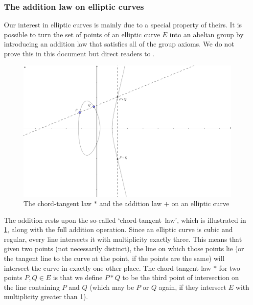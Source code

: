 \subsubsection{The addition law on elliptic curves}
Our interest in elliptic curves is mainly due to a special property of theirs.
It is possible to turn the set of points of an elliptic curve $E$ into an abelian group by introducing an addition law that satisfies all of the group axioms.
We do not prove this in this document but direct readers to \cite{silverman2009}.
\begin{figure}[htbp]
	\centering
	\includegraphics[scale=0.3]{../Figures/ellipticaddition.png}
	\caption{The chord-tangent law $*$ and the addition law $+$ on an elliptic curve}
	\label{ellipticaddition}
\end{figure}
The addition rests upon the so-called `chord-tangent~law', which is illustrated in \cref{ellipticaddition}, along with the full addition operation.
Since an elliptic curve is cubic and regular, every line intersects it with multiplicity exactly three.
This means that given two points (not necessarily distinct), the line on which those points lie (or the tangent line to the curve at the point, if the points are the same) will intersect the curve in exactly one other place.
The chord-tangent law $*$ for two points $P,Q \in E$ is that we define $P * Q$ to be the third point of intersection on the line containing $P$ and $Q$ (which may be $P$ or $Q$ again, if they intersect $E$ with multiplicity greater than 1).

